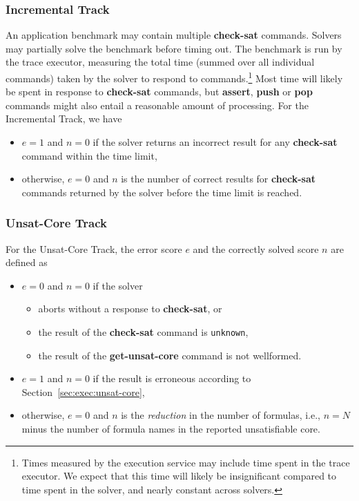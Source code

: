 \documentclass[12pt]{article}
\newcommand{\akey}[1]{\textbf{#1}\xspace}
\newcommand{\inctrack}{Incremental Track\xspace}
\newcommand{\ucoretrack}{Unsat-Core Track\xspace}
\newcommand{\executionservice}{execution service\xspace}
\begin{document}
\subsubsection{\inctrack}
%
An application benchmark may contain multiple \akey{check-sat}
commands.  Solvers may partially solve the benchmark before timing
out.  The benchmark is run by the trace executor, measuring the total
time (summed over all individual commands) taken by the solver to
respond to commands.\footnote{Times measured by the \executionservice may include
  time spent in the trace executor.  We expect that this time will
  likely be insignificant compared to time spent in the solver, and
  nearly constant across solvers.}  Most time will likely be spent in
response to \akey{check-sat} commands, but \akey{assert}, \akey{push}
or \akey{pop} commands might also entail a reasonable amount of
processing.  For the \inctrack, we have
\begin{itemize}
\item $e=1$ and $n=0$ if the solver returns an incorrect result for any
  \akey{check-sat} command within the time limit,
\item otherwise, $e=0$ and $n$ is the number of correct results for
  \akey{check-sat} commands returned by the solver before the time
  limit is reached.
\end{itemize}

\subsubsection{\ucoretrack}
  For the \ucoretrack, the error score $e$ and the correctly solved score $n$
  are defined as
  \begin{itemize}
  \item $e=0$ and $n=0$ if the solver
    \begin{itemize}[noitemsep,nolistsep]
      \item aborts without a response to \akey{check-sat}, or
      \item the result of the \akey{check-sat} command is \texttt{unknown},
      \item the result of the \akey{get-unsat-core} command is not wellformed.
    \end{itemize}
  \item $e=1$ and  $n=0$ if the result is erroneous according to
    Section~\ref{sec:exec:unsat-core},
  \item otherwise, $e=0$ and $n$ is the \emph{reduction} in the number of
    formulas, i.e., $n = N$ minus the number of formula names in the
    reported unsatisfiable core.
  \end{itemize}
\end{document}
